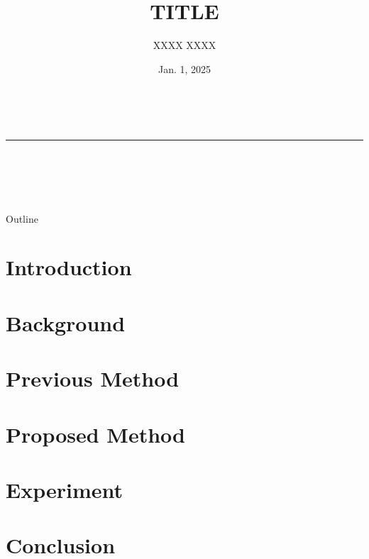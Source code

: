 \documentclass[aspectratio=169, 10.5pt]{beamer}
\title[TITLE]{TITLE}
\institute[XXXX XXXX Lab.]{XXXX XXXX Lab.}
\author[XXXX XXXX]{XXXX XXXX}
\date[Jan. 1, 2025]{Jan. 1, 2025}
\begin{document}
\begin{frame}
	\begin{center}
		\vspace{1.0em}
		\Large
		\textbf{\inserttitle} \\
		\vspace{-1.0em}
		\noindent\textcolor{blue!20}{\rule{0.7\linewidth}{1.5pt}} \\
		\vspace{1.0em}
		\begin{minipage}{0.35\linewidth}
			\begin{center}
				\footnotesize
				\insertinstitute \\
				\insertauthor \\
				\insertdate
			\end{center}
		\end{minipage}
		\begin{minipage}{0.35\linewidth}
			\begin{center}
				\inserttitlegraphic
			\end{center}
		\end{minipage}
	\end{center}
\end{frame}

\begin{frame}{Outline}
	\tableofcontents
\end{frame}

\section{Introduction}


\section{Background}


\section{Previous Method}


\section{Proposed Method}


\section{Experiment}


\section{Conclusion}



\end{document}

